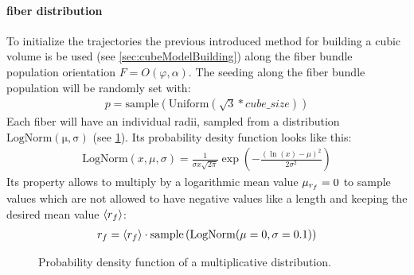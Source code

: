 \paragraph{fiber distribution}
To initialize the trajectories the previous introduced method for building a cubic volume is be used (see \cref{sec:cubeModelBuilding}) along the fiber bundle population orientation $F = O(\varphi, \alpha)$.
The seeding along the fiber bundle population will be randomly set with:
\begin{align}
p = \mathrm{sample}\left(\mathrm{Uniform}(\sqrt{3}*\mathit{cube\_size})\right)
\end{align}
Each fiber will have an individual radii, sampled from a  distribution $\mathrm{LogNorm(
\mu,\sigma)}$ (see \cref{fig:logNormal}).
Its probability desity function looks like this:
\begin{align}
\mathrm{LogNorm}(x,\mu,\sigma)=\frac{1}{\sigma x \sqrt{2\pi}}\exp\left(-\frac{(\ln(x)-\mu)^2}{2 \sigma^2}\right)
\end{align}
% 
Its property allows to multiply by a logarithmic mean value $\textnormal{$\mu_{r_f}$}=0$ to sample values which are not allowed to have negative values like a length and keeping the desired mean value $\textnormal{$\langle{r_f}\rangle$}$:
\begin{align}
\textnormal{$r_f$} = \textnormal{$\langle{r_f}\rangle$} \cdot \mathrm{sample}\left(\mathrm{LogNorm}(\mu=0,\sigma=0.1)\right)
\end{align}
% 
\begin{figure}[!t]
\centering
\tikzset{external/export=false}
\caption[]{ Probability density function of a multiplicative  distribution.}
\label{fig:logNormal}
\end{figure}
% 
